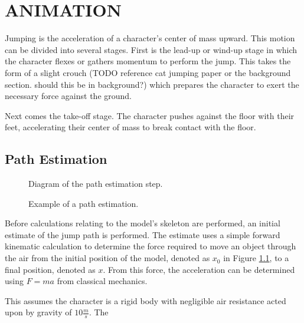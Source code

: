  
\chapter{ANIMATION}
\label{chapter:animation}

Jumping is the acceleration of a character's center of mass upward.  This motion can be divided into several stages.  First is the lead-up or wind-up stage in which the character flexes or gathers momentum to perform the jump.  This takes the form of a slight crouch (TODO reference cat jumping paper or the background section.  should this be in background?) which prepares the character to exert the necessary force against the ground.  

Next comes the take-off stage.  The character pushes against the floor with their feet, accelerating their center of mass to break contact with the floor.  

\section{Path Estimation}

\begin{figure}[ht]
	\label{fig:pathEstimate}
	\centering
	
	\caption{Diagram of the path estimation step.}
\end{figure}

\begin{figure}[ht]
	\label{fig:pathExample}
	\caption{Example of a path estimation.}
\end{figure}
Before calculations relating to the model's skeleton are performed, an initial estimate of the jump path is performed.  The estimate uses a simple forward kinematic calculation to determine the force required to move an object through the air from the initial position of the model, denoted as $x_0$ in Figure \ref{fig:pathEstimate}, to a final position, denoted as $x$.  From this force, the acceleration can be determined using $F=ma$ from classical mechanics.

This assumes the character is a rigid body with negligible air resistance acted upon by gravity of $10\frac{m}{s}$.  The 

